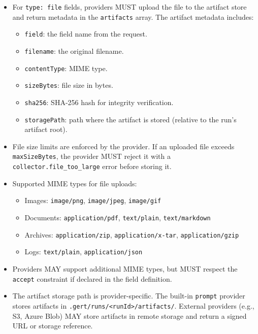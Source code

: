 \begin{itemize}
  \item For \texttt{type: file} fields, providers MUST upload the file to the
        artifact store and return metadata in the \texttt{artifacts} array.
        The artifact metadata includes:
        \begin{itemize}
          \item \texttt{field}: the field name from the request.
          \item \texttt{filename}: the original filename.
          \item \texttt{contentType}: MIME type.
          \item \texttt{sizeBytes}: file size in bytes.
          \item \texttt{sha256}: SHA-256 hash for integrity verification.
          \item \texttt{storagePath}: path where the artifact is stored (relative
                to the run's artifact root).
        \end{itemize}
  \item File size limits are enforced by the provider.  If an uploaded file
        exceeds \texttt{maxSizeBytes}, the provider MUST reject it with a
        \texttt{collector.file\_too\_large} error before storing it.
  \item Supported MIME types for file uploads:
        \begin{itemize}
          \item Images: \texttt{image/png}, \texttt{image/jpeg}, \texttt{image/gif}
          \item Documents: \texttt{application/pdf}, \texttt{text/plain},
                \texttt{text/markdown}
          \item Archives: \texttt{application/zip}, \texttt{application/x-tar},
                \texttt{application/gzip}
          \item Logs: \texttt{text/plain}, \texttt{application/json}
        \end{itemize}
  \item Providers MAY support additional MIME types, but MUST respect the
        \texttt{accept} constraint if declared in the field definition.
  \item The artifact storage path is provider-specific.  The built-in
        \texttt{prompt} provider stores artifacts in
        \texttt{.gert/runs/<runId>/artifacts/}.  External providers (e.g., S3,
        Azure Blob) MAY store artifacts in remote storage and return a signed
        URL or storage reference.
\end{itemize}

